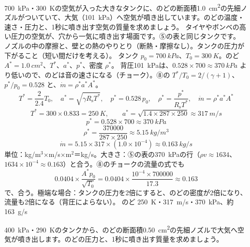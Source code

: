 \begin{phreidai}
\label{ph:熱-4:ex12}\qty{700}{kPa}・\qty{300}{K}の空気が入った大きなタンクに、のどの断面積\qty{1.0}{cm^2}の先細ノズルがついていて、大気（\qty{101}{kPa}）へ空気が噴き出しています。のどの温度・速さ・圧力と、1秒に噴き出す空気の質量を求めましょう。
\phbamen
タイヤやボンベの高い圧力の空気が、穴から一気に噴き出す場面です。⑤の表と同じタンクです。
\phmushi
ノズルの中の摩擦と、壁との熱のやりとり（断熱・摩擦なし）。タンクの圧力が下がること（短い間だけを考える）。
\phzu
タンク $p_0=\qty{700}{kPa}$、$T_0=\qty{300}{K}$。のど $A^*=\qty{1.0}{cm^2}$、$T^*$、$a^*$、$p^*$、密度 $\rho^*$。
\phriyu
背圧\qty{101}{kPa}は、$0.528\times700\approx\qty{370}{kPa}$ より低いので、のどは音の速さになる（チョーク）。⑧の $T^*/T_0=2/(\gamma+1)$、$p^*/p_0=0.528$ と、$\dot m=\rho^*a^*A^*$。
\phtateru
\[ T^*=\frac{2}{2.4}T_0,\quad a^*=\sqrt{\gamma R_{\mathrm s}T^*},\quad p^*=0.528\,p_0,\quad \rho^*=\frac{p^*}{R_{\mathrm s}T^*},\quad \dot m=\rho^*a^*A^* \]
\phtoku
\[ T^*=300\times0.833=\qty{250}{K},\qquad a^*=\sqrt{1.4\times287\times250}\approx\qty{317}{m/s} \]
\[ p^*=0.528\times700\approx\qty{370}{kPa} \]
\[ \rho^*=\frac{\num{370000}}{287\times250}\approx\qty{5.15}{kg/m^3} \]
\[ \dot m=5.15\times317\times(1.0\times10^{-4})\approx\qty{0.163}{kg/s} \]
\phtashikame
単位：kg/m$^3$×m/s×m$^2$＝kg/s。大きさ：⑤の表の\qty{370}{kPa}の行（$\rho v\approx1634$、$1634\times10^{-4}\approx0.163$）と合う。⑧のチョークの流量の式でも
\[ 0.0404\times\frac{A^*p_0}{\sqrt{T_0}}=0.0404\times\frac{10^{-4}\times\num{700000}}{17.3}\approx0.163 \]
で、合う。極端な場合：タンクの圧力を2倍にすると、のどの密度が2倍になり、流量も2倍になる（背圧によらない）。
\kotae のど \qty{250}{K}・\qty{317}{m/s}・\qty{370}{kPa}、約\qty{163}{g/s}
\end{phreidai}
\begin{jibun}
\qty{400}{kPa}・\qty{290}{K}のタンクから、のどの断面積\qty{0.50}{cm^2}の先細ノズルで大気へ空気が噴き出します。のどの圧力と、1秒に噴き出す質量を求めましょう。
\end{jibun}

